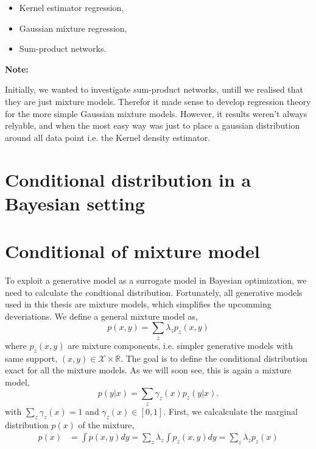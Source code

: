 \begin{itemize}[noitemsep]
     \item Kernel estimator regression,
     \item Gaussian mixture regression,
     \item Sum-product networks.
 \end{itemize}

\textbf{Note:}

Initially, we wanted to investigate sum-product networks, untill we realised that they are just
mixture models. Therefor it made sense to develop regression theory for the more simple Gaussian
mixture models. However, it results weren't always relyable, and
when the most easy way was just to place a gaussian distribution around
all data point i.e. the Kernel density estimator. 


 \section{Conditional distribution in a Bayesian setting}\label{mixture_include_prior}
 




\section{Conditional of mixture model}\label{Conditional_mixture}
To exploit a generative model as a surrogate model in Bayesian optimization, we need to calculate
the condtional distribution. Fortunately, all generative models used in this thesis are mixture
models, which simplifies the upcomming deveriations. We define a general mixture model as, 
$$p(x,y) = \sum_z \lambda_z p_z(x,y)$$ where $p_z(x,y)$ are mixture components, i.e. simpler
generative models with same support, $(x,y) \in \mathcal{X}\times \mathbb{R}$. The goal is to define
the conditional distribution exact for all the mixture models. As we will soon see, this is again a
mixture model, 
$$p(y|x) = \sum_z \gamma_z(x) p_z(y|x).$$ with $\sum_z \gamma_z(x) = 1$ and $\gamma_z(x) \in [0,1]$.
First, we calcalculate the marginal distribution $p(x)$ of the mixture, 
\begin{align*}
    p(x) &= \int p(x,y) dy =\sum_{z} \lambda_z \int p_z(x,y) dy =\sum_{z} \lambda_z p_z(x)
\end{align*}

